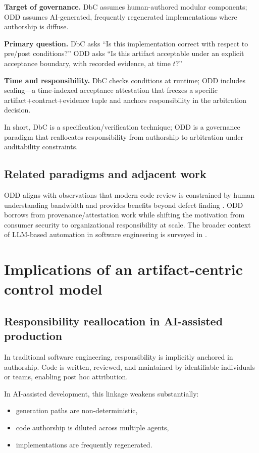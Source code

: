 \documentclass[conference]{IEEEtran}
\begin{document}
\textbf{Target of governance.} DbC assumes human-authored modular components; ODD assumes AI-generated, frequently regenerated implementations where authorship is diffuse.

\textbf{Primary question.} DbC asks ``Is this implementation correct with respect to pre/post conditions?'' ODD asks ``Is this artifact acceptable under an explicit acceptance boundary, with recorded evidence, at time $t$?''

\textbf{Time and responsibility.} DbC checks conditions at runtime; ODD includes sealing---a time-indexed acceptance attestation that freezes a specific artifact+contract+evidence tuple and anchors responsibility in the arbitration decision.

In short, DbC is a specification/verification technique; ODD is a governance paradigm that reallocates responsibility from authorship to arbitration under auditability constraints.

\subsection{Related paradigms and adjacent work}
ODD aligns with observations that modern code review is constrained by human understanding bandwidth and provides benefits beyond defect finding \cite{bacchelli2013codereview}. ODD borrows from provenance/attestation work \cite{torresarias2019intoto, openssf2023slsa, newman2022sigstore} while shifting the motivation from consumer security to organizational responsibility at scale. The broader context of LLM-based automation in software engineering is surveyed in \cite{fan2023llm4se}.

\section{Implications of an artifact-centric control model}\label{sec:implications}
\subsection{Responsibility reallocation in AI-assisted production}
In traditional software engineering, responsibility is implicitly anchored in authorship. Code is written, reviewed, and maintained by identifiable individuals or teams, enabling post hoc attribution.

In AI-assisted development, this linkage weakens substantially:
\begin{itemize}
\item generation paths are non-deterministic,
\item code authorship is diluted across multiple agents,
\item implementations are frequently regenerated.
\end{itemize}
\end{document}
